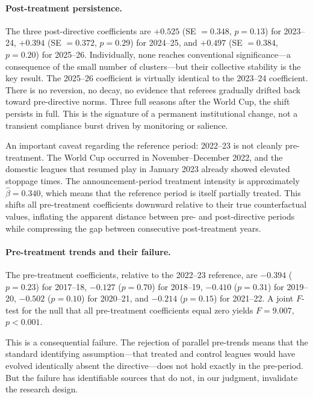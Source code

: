 \paragraph{Post-treatment persistence.} The three post-directive
coefficients are $+0.525$ (SE $= 0.348$, $p = 0.13$) for 2023--24,
$+0.394$ (SE $= 0.372$, $p = 0.29$) for 2024--25, and $+0.497$
(SE $= 0.384$, $p = 0.20$) for 2025--26. Individually, none reaches
conventional significance---a consequence of the small number of
clusters---but their collective stability is the key result. The
2025--26 coefficient is virtually identical to the 2023--24 coefficient.
There is no reversion, no decay, no evidence that referees gradually
drifted back toward pre-directive norms. Three full seasons after the
World Cup, the shift persists in full. This is the signature of a
permanent institutional change, not a transient compliance burst driven
by monitoring or salience.

An important caveat regarding the reference period: 2022--23 is not
cleanly pre-treatment. The World Cup occurred in November--December
2022, and the domestic leagues that resumed play in January 2023
already showed elevated stoppage times. The announcement-period
treatment intensity is approximately $\hat\beta = 0.340$, which means
that the reference period is itself partially treated. This shifts all
pre-treatment coefficients downward relative to their true
counterfactual values, inflating the apparent distance between pre- and
post-directive periods while compressing the gap between consecutive
post-treatment years.

\paragraph{Pre-treatment trends and their failure.} The pre-treatment
coefficients, relative to the 2022--23 reference, are $-0.394$ ($p =
0.23$) for 2017--18, $-0.127$ ($p = 0.70$) for 2018--19, $-0.410$
($p = 0.31$) for 2019--20, $-0.502$ ($p = 0.10$) for 2020--21, and
$-0.214$ ($p = 0.15$) for 2021--22. A joint $F$-test for the null that
all pre-treatment coefficients equal zero yields $F = 9.007$,
$p < 0.001$.

This is a consequential failure. The rejection of parallel pre-trends
means that the standard identifying assumption---that treated and
control leagues would have evolved identically absent the
directive---does not hold exactly in the pre-period. But the failure
has identifiable sources that do not, in our judgment, invalidate the
research design.

